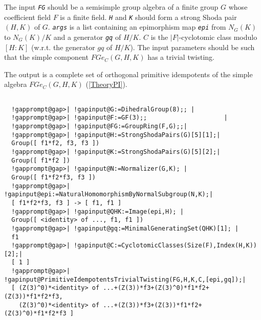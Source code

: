 \documentclass[a4paper,11pt]{report}
\begin{document}
{{{ The input \mbox{\texttt{\mdseries\slshape FG}} should be a semisimple group algebra of a finite group $G$ whose coefficient field $F$ is a finite field. \mbox{\texttt{\mdseries\slshape H}} and \mbox{\texttt{\mdseries\slshape K}} should form a strong Shoda pair $(H,K)$ of $G$. \mbox{\texttt{\mdseries\slshape args}} is a list containing an epimorphism map \mbox{\texttt{\mdseries\slshape epi}} from $N_G(K)$ to $N_G(K)/K$ and a generator \mbox{\texttt{\mdseries\slshape gq}} of $H/K$. $C$ is the $|F|$-cyclotomic class modulo $[H:K]$ (w.r.t. the generator $gq$ of $H/K$). The input parameters should be such that the simple component $FGe_C(G,H,K)$ has a trivial twisting. 

 The output is a complete set of orthogonal primitive idempotents of the simple
algebra $FGe_C(G,H,K)$ (\ref{TheoryPI}). 
\begin{Verbatim}[commandchars=!@|,fontsize=\small,frame=single,label=Example]
  
  !gapprompt@gap>| !gapinput@G:=DihedralGroup(8);; |
  !gapprompt@gap>| !gapinput@F:=GF(3);;                     |
  !gapprompt@gap>| !gapinput@FG:=GroupRing(F,G);;|
  !gapprompt@gap>| !gapinput@H:=StrongShodaPairs(G)[5][1];|
  Group([ f1*f2, f3, f3 ])
  !gapprompt@gap>| !gapinput@K:=StrongShodaPairs(G)[5][2];|
  Group([ f1*f2 ])
  !gapprompt@gap>| !gapinput@N:=Normalizer(G,K); |
  Group([ f1*f2*f3, f3 ])
  !gapprompt@gap>| !gapinput@epi:=NaturalHomomorphismByNormalSubgroup(N,K);|
  [ f1*f2*f3, f3 ] -> [ f1, f1 ]
  !gapprompt@gap>| !gapinput@QHK:=Image(epi,H); |
  Group([ <identity> of ..., f1, f1 ])
  !gapprompt@gap>| !gapinput@gq:=MinimalGeneratingSet(QHK)[1]; |
  f1
  !gapprompt@gap>| !gapinput@C:=CyclotomicClasses(Size(F),Index(H,K))[2];|
  [ 1 ]
  !gapprompt@gap>| !gapinput@PrimitiveIdempotentsTrivialTwisting(FG,H,K,C,[epi,gq]);|
  [ (Z(3)^0)*<identity> of ...+(Z(3))*f3+(Z(3)^0)*f1*f2+(Z(3))*f1*f2*f3, 
    (Z(3)^0)*<identity> of ...+(Z(3))*f3+(Z(3))*f1*f2+(Z(3)^0)*f1*f2*f3 ]
  
\end{Verbatim}
 }

 }

 }

    
\end{document}

